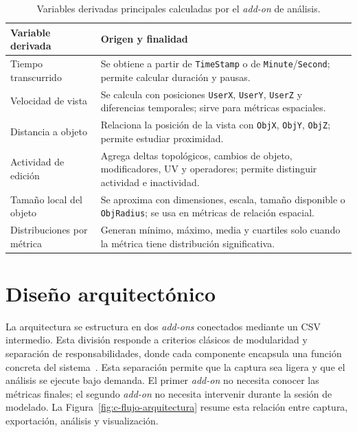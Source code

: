 \begin{table}[H]
\centering
\scriptsize
\renewcommand{\arraystretch}{1.15}
\begin{tabularx}{\textwidth}{p{4cm}X}
\toprule
\textbf{Variable derivada} & \textbf{Origen y finalidad} \\
\midrule
Tiempo transcurrido & Se obtiene a partir de \texttt{TimeStamp} o de \texttt{Minute}/\texttt{Second}; permite calcular duración y pausas. \\
Velocidad de vista & Se calcula con posiciones \texttt{UserX}, \texttt{UserY}, \texttt{UserZ} y diferencias temporales; sirve para métricas espaciales. \\
Distancia a objeto & Relaciona la posición de la vista con \texttt{ObjX}, \texttt{ObjY}, \texttt{ObjZ}; permite estudiar proximidad. \\
Actividad de edición & Agrega deltas topológicos, cambios de objeto, modificadores, UV y operadores; permite distinguir actividad e inactividad. \\
Tamaño local del objeto & Se aproxima con dimensiones, escala, tamaño disponible o \texttt{ObjRadius}; se usa en métricas de relación espacial. \\
Distribuciones por métrica & Generan mínimo, máximo, media y cuartiles solo cuando la métrica tiene distribución significativa. \\
\bottomrule
\end{tabularx}
\caption{Variables derivadas principales calculadas por el \textit{add-on} de análisis.}
\label{tab:c-variables-derivadas}
\end{table}

\section{Diseño arquitectónico}
\label{sec:c-diseno-arquitectonico}

La arquitectura se estructura en dos \textit{add-ons} conectados mediante un CSV intermedio. Esta división responde a criterios clásicos de modularidad y separación de responsabilidades, donde cada componente encapsula una función concreta del sistema~\cite{parnas1972criteria,gamma1994}. Esta separación permite que la captura sea ligera y que el análisis se ejecute bajo demanda. El primer \textit{add-on} no necesita conocer las métricas finales; el segundo \textit{add-on} no necesita intervenir durante la sesión de modelado. La Figura~\ref{fig:c-flujo-arquitectura} resume esta relación entre captura, exportación, análisis y visualización.

